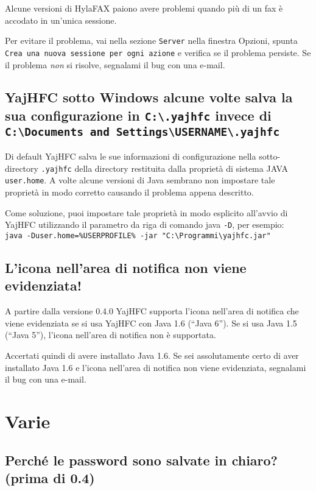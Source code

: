 \documentclass[a4paper,10pt]{scrartcl}
\begin{document}
Alcune versioni di HylaFAX paiono avere problemi quando più di un fax è accodato in un'unica sessione.

Per evitare il problema, vai nella sezione \texttt{Server} nella finestra Opzioni, spunta \texttt{Crea una nuova sessione per ogni azione} e verifica se il problema persiste.
Se il problema \emph{non} si risolve, segnalami il bug con una e-mail.

\subsection{YajHFC sotto Windows alcune volte salva la sua configurazione in \texttt{C:\textbackslash .yajhfc} invece di \texttt{C:\textbackslash Documents and Settings\textbackslash USERNAME\textbackslash .yajhfc}}

Di default YajHFC salva le sue informazioni di configurazione nella sotto-directory \texttt{.yajhfc} della directory restituita dalla
proprietà di sistema JAVA \texttt{user.home}.
A volte alcune versioni di Java sembrano non impostare tale proprietà in modo corretto causando il problema appena descritto.

Come soluzione, puoi impostare tale proprietà in modo esplicito all'avvio di YajHFC utilizzando il parametro da riga di comando java \texttt{-D}, per esempio: \\
\texttt{java -Duser.home=\%USERPROFILE\% -jar "C:\textbackslash Programmi\textbackslash yajhfc.jar"}

\subsection{L'icona nell'area di notifica non viene evidenziata!}

A partire dalla versione 0.4.0 YajHFC supporta l'icona nell'area di notifica che viene evidenziata se si usa YajHFC con Java 1.6 (``Java 6'').
Se si usa Java 1.5 (``Java 5''), l'icona nell'area di notifica non è supportata.

Accertati quindi di avere installato Java 1.6. Se sei assolutamente certo di aver installato Java 1.6 e l'icona nell'area di notifica non viene evidenziata, segnalami il bug con una e-mail.


\section{Varie}

\subsection{Perché le password sono salvate in chiaro? (prima di 0.4)}
\end{document}
